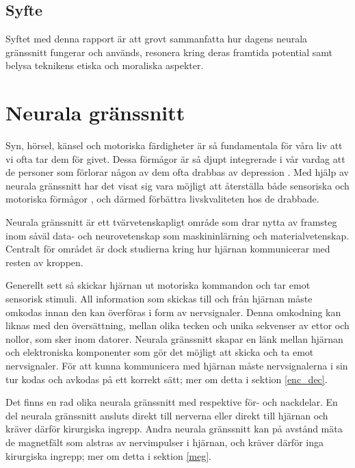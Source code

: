 \documentclass[12pt, a4paper]{article}
\begin{document}
\subsection{Syfte}

Syftet med denna rapport är att grovt sammanfatta hur dagens neurala gränssnitt
fungerar och används, resonera kring deras framtida potential samt belysa
teknikens etiska och moraliska aspekter.


\section{Neurala gränssnitt}

Syn, hörsel, känsel och motoriska färdigheter är så fundamentala för våra liv
att vi ofta tar dem för givet. Dessa förmågor är så djupt integrerade i vår
vardag att de personer som förlorar någon av dem ofta drabbas av depression
\cite{depression}. Med hjälp av neurala gränssnitt har det visat sig vara
möjligt att återställa både sensoriska \cite{sight1,sound,touch} och motoriska
förmågor \cite{prosthetic_operation}, och därmed förbättra livskvaliteten hos de
drabbade.

Neurala gränssnitt är ett tvärvetenskapligt område som drar nytta av framsteg
inom såväl data- och neurovetenskap som maskininlärning och materialvetenskap.
Centralt för området är dock studierna kring hur hjärnan kommunicerar med resten
av kroppen.

Generellt sett så skickar hjärnan ut motoriska kommandon och tar emot sensorisk
stimuli. All information som skickas till och från hjärnan måste omkodas innan
den kan överföras i form av nervsignaler. Denna omkodning kan liknas med den
översättning, mellan olika tecken och unika sekvenser av ettor och nollor, som
sker inom datorer. Neurala gränssnitt skapar en länk mellan hjärnan och
elektroniska komponenter som gör det möjligt att skicka och ta emot
nervsignaler. För att kunna kommunicera med hjärnan måste nervsignalerna i sin
tur kodas och avkodas på ett korrekt sätt; mer om detta i sektion \ref{enc_dec}.

Det finns en rad olika neurala gränssnitt med respektive för- och nackdelar. En
del neurala gränssnitt ansluts direkt till nerverna eller direkt till hjärnan
och kräver därför kirurgiska ingrepp. Andra neurala gränssnitt kan på avstånd
mäta de magnetfält som alstras av nervimpulser i hjärnan, och kräver därför inga
kirurgiska ingrepp; mer om detta i sektion \ref{meg}.
\end{document}
